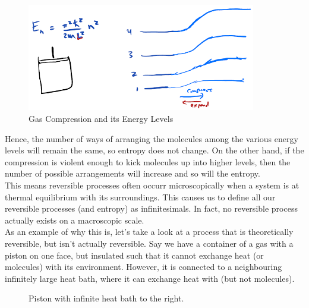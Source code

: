 \begin{figure}[H]
	\centering
	\includegraphics[width=100mm]{34.png}
	\caption{Gas Compression and its Energy Levels}
\end{figure}

Hence, the number of ways of arranging the molecules among the various energy levels will remain the same, so entropy does not change. On the other hand, if the compression is violent enough to kick molecules up into higher levels, then the number of possible arrangements will increase and so will the entropy. \\

This means reversible processes often occurr microscopically when a system is at thermal equilibrium with its surroundings. This causes us to define all our reversible processes (and entropy) as infinitesimals. In fact, no reversible process actually exists on a macroscopic scale. \\

As an example of why this is, let's take a look at a process that is theoretically reversible, but isn't actually reversible. Say we have a container of a gas with a piston on one face, but insulated such that it cannot exchange heat (or molecules) with its environment. However, it is connected to a neighbouring infinitely large heat bath, where it can exchange heat with (but not molecules).

\begin{figure}[H]
	\centering
	\caption{Piston with infinite heat bath to the right.}
\end{figure}

